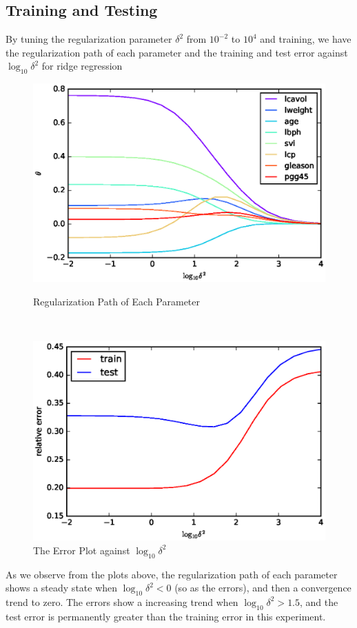 \documentclass[10pt]{article}
\begin{document}
\subsection{Training and Testing}
By tuning the regularization parameter $\delta^2$ from $10^{-2}$ to $10^4$ and training, we have the regularization path of each parameter and the training and test error against $\log_{10}\delta^2$ for ridge regression
\begin{figure}[H]
\centering
\begin{minipage}[b]{0.45\textwidth}
\centering
\includegraphics[scale=.5]{plot2_1.eps}
\caption{Regularization Path of Each Parameter}
\label{plot2_1}
\end{minipage}
\
\begin{minipage}[b]{0.45\textwidth}
\centering
\includegraphics[scale=.5]{plot2_2.eps}
\caption{The Error Plot against $\log_{10}\delta^2$}
\label{plot2_2}
\end{minipage}
\end{figure}
As we observe from the plots above, the regularization path of each parameter shows a steady state when $\log_{10}\delta^2 < 0$ (so as the errors), and then a convergence trend to zero. The errors show a increasing trend when $\log_{10}\delta^2 > 1.5$, and the test error is permanently greater than the training error in this experiment.
\end{document}
